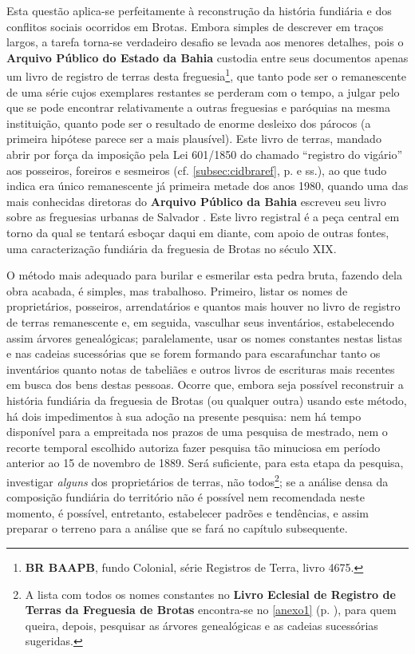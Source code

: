 Esta questão aplica-se perfeitamente à reconstrução da história fundiária e dos conflitos sociais ocorridos em Brotas. Embora simples de descrever em traços largos, a tarefa torna-se verdadeiro desafio se levada aos menores detalhes, pois o \textbf{Arquivo Público do Estado da Bahia} custodia entre seus documentos apenas um livro de registro de terras desta freguesia\footnote{\textbf{BR BAAPB}, fundo Colonial, série Registros de Terra, livro 4675.}, que tanto pode ser o remanescente de uma série cujos exemplares restantes se perderam com o tempo, a julgar pelo que se pode encontrar relativamente a outras freguesias e paróquias na mesma instituição, quanto pode ser o resultado de enorme desleixo dos párocos (a primeira hipótese parece ser a mais plausível). Este livro de terras, mandado abrir por força da imposição pela Lei 601/1850 do chamado  ``registro do vigário'' aos posseiros, foreiros e sesmeiros (cf. \autoref{subsec:cidbraref}, p. \pageref{subsec:cidbraref} e ss.), ao que tudo indica era único remanescente já primeira metade dos anos 1980, quando uma das mais conhecidas diretoras do \textbf{Arquivo Público da Bahia} escreveu seu livro sobre as freguesias urbanas de Salvador \cite{NASCIMENTO2007}. Este livro registral é a peça central em torno da qual se tentará esboçar daqui em diante, com apoio de outras fontes, uma caracterização fundiária da freguesia de Brotas no século XIX. 

O método mais adequado para burilar e esmerilar esta pedra bruta, fazendo dela obra acabada, é simples, mas trabalhoso. Primeiro, listar os nomes de proprietários, posseiros, arrendatários e quantos mais houver no livro de registro de terras remanescente e, em seguida, vasculhar seus inventários, estabelecendo assim árvores genealógicas; paralelamente, usar os nomes constantes nestas listas e nas cadeias sucessórias que se forem formando para escarafunchar tanto os inventários quanto notas de tabeliães e outros livros de escrituras mais recentes em busca dos bens destas pessoas. Ocorre que, embora seja possível reconstruir a história fundiária da freguesia de Brotas (ou qualquer outra) usando este método, há dois impedimentos à sua adoção na presente pesquisa: nem há tempo disponível para a empreitada nos prazos de uma pesquisa de mestrado, nem o recorte temporal escolhido autoriza fazer pesquisa tão minuciosa em período anterior ao 15 de novembro de 1889. Será suficiente, para esta etapa da pesquisa, investigar \textit{alguns} dos proprietários de terras, não todos\footnote{A lista com todos os nomes constantes no \textbf{Livro Eclesial de Registro de Terras da Freguesia de Brotas} encontra-se no \autoref{anexo1} (p. \pageref{anexo1}), para quem queira, depois, pesquisar as árvores genealógicas e as cadeias sucessórias sugeridas.}; se a análise densa da composição fundiária do território não é possível nem recomendada neste momento, é possível, entretanto, estabelecer padrões e tendências, e assim preparar o terreno para a análise que se fará no capítulo subsequente.

